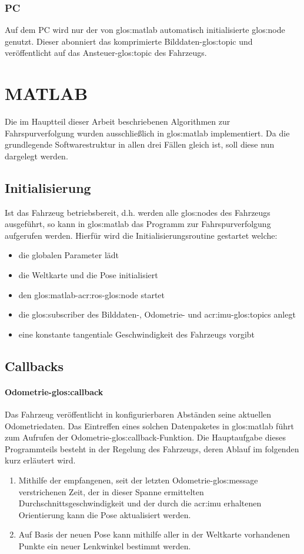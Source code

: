 \subsubsection{PC}
Auf dem PC wird nur der von \gls{glos:matlab} automatisch initialisierte \gls{glos:node} genutzt. Dieser abonniert das komprimierte Bilddaten-\gls{glos:topic} und veröffentlicht auf das Ansteuer-\gls{glos:topic} des Fahrzeugs.

\section{MATLAB}
Die im Hauptteil dieser Arbeit beschriebenen Algorithmen zur Fahrspurverfolgung wurden ausschließlich in \gls{glos:matlab} implementiert. Da die grundlegende Softwarestruktur in allen drei Fällen gleich ist, soll diese nun dargelegt werden.

\subsection{Initialisierung}
Ist das Fahrzeug betriebsbereit, d.h. werden alle \glspl{glos:node} des Fahrzeugs ausgeführt, so kann in \gls{glos:matlab} das Programm zur Fahrspurverfolgung aufgerufen werden. Hierfür wird die Initialisierungsroutine gestartet welche:
\begin{itemize}
\item die globalen Parameter lädt
\item die Weltkarte und die Pose initialisiert
\item den \gls{glos:matlab}-\gls{acr:ros}-\gls{glos:node} startet
\item die \gls{glos:subscriber} des Bilddaten-, Odometrie- und \gls{acr:imu}-\glspl{glos:topic} anlegt
\item eine konstante tangentiale Geschwindigkeit des Fahrzeugs vorgibt 
\end{itemize}

\subsection{Callbacks}
\paragraph{Odometrie-\gls{glos:callback}}
Das Fahrzeug veröffentlicht in konfigurierbaren Abständen seine aktuellen Odometriedaten.
Das Eintreffen eines solchen Datenpaketes in \gls{glos:matlab} führt zum Aufrufen der Odometrie-\gls{glos:callback}-Funktion. Die Hauptaufgabe dieses Programmteils besteht in der Regelung des Fahrzeugs, deren Ablauf im folgenden kurz erläutert wird.
\begin{enumerate}
\item Mithilfe der empfangenen, seit der letzten Odometrie-\gls{glos:message} verstrichenen Zeit, der in dieser Spanne ermittelten Durchschnittsgeschwindigkeit und der durch die \gls{acr:imu} erhaltenen Orientierung kann die Pose aktualisiert werden.
\item Auf Basis der neuen Pose kann mithilfe aller in der Weltkarte vorhandenen Punkte ein neuer Lenkwinkel bestimmt werden.
\end{enumerate}
